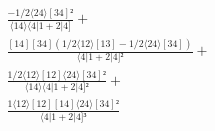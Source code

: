 \documentclass[varwidth, border=5pt]{standalone}
\begin{document}
\begin{my}
$\begin{gathered}
\scriptscriptstyle\frac{-1/2⟨24⟩[34]²}{⟨14⟩⟨4|1+2|4]} +\\
\scriptscriptstyle\frac{[14][34](1/2⟨12⟩[13]-1/2⟨24⟩[34])}{⟨4|1+2|4]²} +\\
\scriptscriptstyle\frac{1/2⟨12⟩[12]⟨24⟩[34]²}{⟨14⟩⟨4|1+2|4]²} +\\
\scriptscriptstyle\frac{1⟨12⟩[12][14]⟨24⟩[34]²}{⟨4|1+2|4]³} \phantom{+}
\end{gathered}$
\end{my}
\end{document}
